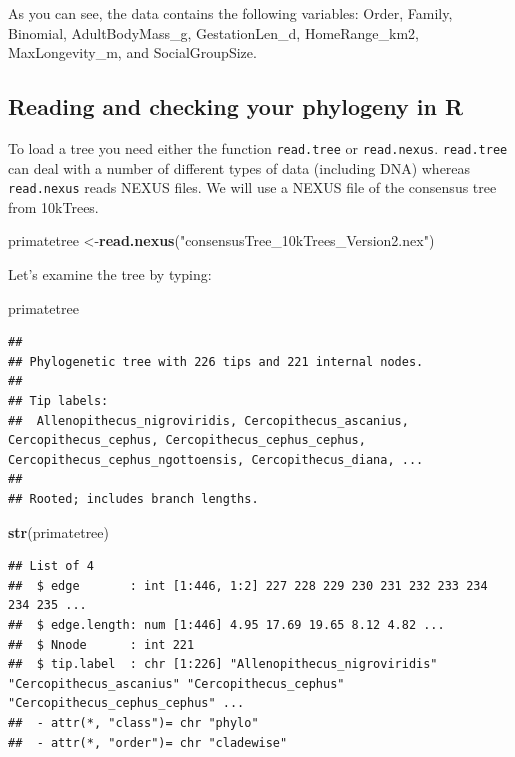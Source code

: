 \documentclass[]{book}
\newenvironment{Shaded}{\begin{snugshade}}{\end{snugshade}}
\newcommand{\KeywordTok}[1]{\textcolor[rgb]{0.13,0.29,0.53}{\textbf{{#1}}}}
\newcommand{\StringTok}[1]{\textcolor[rgb]{0.31,0.60,0.02}{{#1}}}
\newcommand{\NormalTok}[1]{{#1}}
\begin{document}
As you can see, the data contains the following variables: Order,
Family, Binomial, AdultBodyMass\_g, GestationLen\_d, HomeRange\_km2,
MaxLongevity\_m, and SocialGroupSize.

\subsection{Reading and checking your phylogeny in
R}\label{reading-and-checking-your-phylogeny-in-r}

To load a tree you need either the function \texttt{read.tree} or
\texttt{read.nexus}. \texttt{read.tree} can deal with a number of
different types of data (including DNA) whereas \texttt{read.nexus}
reads NEXUS files. We will use a NEXUS file of the consensus tree from
10kTrees.

\begin{Shaded}
\begin{Highlighting}[]
\NormalTok{primatetree <-}\KeywordTok{read.nexus}\NormalTok{(}\StringTok{"consensusTree_10kTrees_Version2.nex"}\NormalTok{)}
\end{Highlighting}
\end{Shaded}

Let's examine the tree by typing:

\begin{Shaded}
\begin{Highlighting}[]
\NormalTok{primatetree}
\end{Highlighting}
\end{Shaded}

\begin{verbatim}
## 
## Phylogenetic tree with 226 tips and 221 internal nodes.
## 
## Tip labels:
##  Allenopithecus_nigroviridis, Cercopithecus_ascanius, Cercopithecus_cephus, Cercopithecus_cephus_cephus, Cercopithecus_cephus_ngottoensis, Cercopithecus_diana, ...
## 
## Rooted; includes branch lengths.
\end{verbatim}

\begin{Shaded}
\begin{Highlighting}[]
\KeywordTok{str}\NormalTok{(primatetree)}
\end{Highlighting}
\end{Shaded}

\begin{verbatim}
## List of 4
##  $ edge       : int [1:446, 1:2] 227 228 229 230 231 232 233 234 234 235 ...
##  $ edge.length: num [1:446] 4.95 17.69 19.65 8.12 4.82 ...
##  $ Nnode      : int 221
##  $ tip.label  : chr [1:226] "Allenopithecus_nigroviridis" "Cercopithecus_ascanius" "Cercopithecus_cephus" "Cercopithecus_cephus_cephus" ...
##  - attr(*, "class")= chr "phylo"
##  - attr(*, "order")= chr "cladewise"
\end{verbatim}
\end{document}
